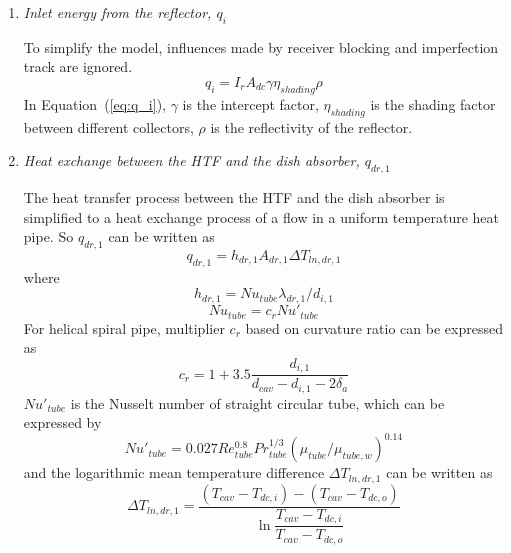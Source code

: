 \begin{enumerate}[label=(\arabic*)]
  \item \emph{Inlet energy from the reflector, $q_i$}
  
  To simplify the model, influences made by receiver blocking and imperfection track are ignored.  
  \begin{equation}
      q_i = I_r A_{dc} \gamma \eta_{shading} \rho
      \label{eq:q_i}
  \end{equation}
  In Equation~(\ref{eq:q_i}), $\gamma$ is the intercept factor, $\eta_{shading}$ is the shading factor between different collectors, $\rho$ is the reflectivity of the reflector.
  \item \emph{Heat exchange between the HTF and the dish absorber, $q_{dr,1}$}
  
  The heat transfer process between the HTF and the dish absorber is simplified to a heat exchange process of a flow in a uniform temperature heat pipe. So $q_{dr,1}$ can be written as  
  \begin{equation}
      q_{dr,1} = h_{dr,1}A_{dr,1}\Delta T_{ln,dr,1}
      \label{eq:q_dr_1}
  \end{equation}
  where  
  \begin{equation}
      h_{dr,1} = Nu_{tube}\lambda_{dr,1} / d_{i,1}
\end{equation}
\begin{equation}
      Nu_{tube} = c_r Nu'_{tube}
\end{equation}
    For helical spiral pipe, multiplier $c_r$ based on curvature ratio can be expressed as~\cite{Pablo2008}
\begin{equation}
	c_{r}=1+3.5\frac{d_{i,1}}{d_{cav}-d_{i,1}-2\delta_{a}}
\end{equation}
$Nu'_{tube}$ is the Nusselt number of straight circular tube, which can be expressed by~\cite{Serth2007}
\begin{equation}
	Nu'_{tube}= 0.027Re_{tube}^{0.8}Pr_{tube}^{1/3}(\mu_{tube}/\mu_{tube,w})^{0.14}
\end{equation}
and the logarithmic mean temperature difference $\Delta{}T_{ln,dr,1}$ can be written as
\begin{equation}
	\Delta{}T_{ln,dr,1}=\frac{(T_{cav}-T_{dc,i})-(T_{cav}-T_{dc,o})}{\ln\dfrac{T_{cav}-T_{dc,i}}{T_{cav}-T_{dc,o}}}
\end{equation}


\end{enumerate}
